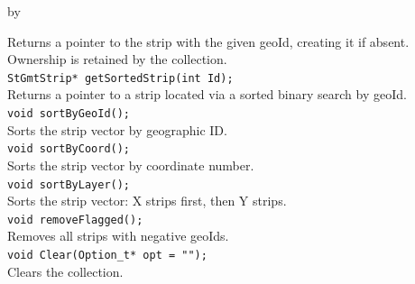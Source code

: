 \documentclass[twoside]{article}
\newcommand{\entrylabel}[1]{\mbox{\textbf{{#1}}}\hfil}%
\newenvironment{entry}
{\begin{list}{}%
    {\renewcommand{\makelabel}{\entrylabel}%
     \setlength{\labelwidth}{90pt}%
     \setlength{\leftmargin}{\labelwidth}
     \advance\leftmargin by \labelsep%
      }%
    }%
  {\end{list}}
\newcommand{\Entrylabel}[1]%
{\raisebox{0pt}[1ex][0pt]{\makebox[\labelwidth][l]%
    {\parbox[t]{\labelwidth}{\hspace{0pt}\textbf{{#1}}}}}}
\newenvironment{Entry}%
{\renewcommand{\entrylabel}{\Entrylabel}\begin{entry}}%
  {\end{entry}}
\begin{document}
\begin{Entry}
    Returns a pointer to the strip with the given geoId, creating it if absent.
    Ownership is retained by the collection.\\
    \verb+StGmtStrip* getSortedStrip(int Id);+\\
    Returns a pointer to a strip located via a sorted binary search by geoId.\\
    \verb+void sortByGeoId();+\\
    Sorts the strip vector by geographic ID.\\
    \verb+void sortByCoord();+\\
    Sorts the strip vector by coordinate number.\\
    \verb+void sortByLayer();+\\
    Sorts the strip vector: X strips first, then Y strips.\\
    \verb+void removeFlagged();+\\
    Removes all strips with negative geoIds.\\
    \verb+void Clear(Option_t* opt = "");+\\
    Clears the collection.\\
\end{Entry}
\clearpage

\end{document}
